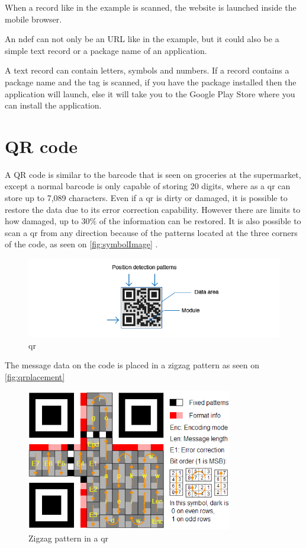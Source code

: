 When a record like in the example is scanned, the website is launched inside the mobile browser. 

An \ac{ndef} can not only be an URL like in the example, but it could also be a simple text record or a package name of an application. 

A text record can contain letters, symbols and numbers. If a record contains a package name and the tag is scanned, if you have the package installed then the application will launch, else it will take you to the Google Play Store where you can install the application. 

\section{QR code}

A QR code is similar to the barcode that is seen on groceries at the supermarket, except a normal barcode is only capable of storing 20 digits, where as a \ac{qr} can store up to 7,089 characters. Even if a \ac{qr} is dirty or damaged, it is possible to restore the data due to its error correction capability. However there are limits to how damaged, up to 30\% of the information can be restored. It is also possible to scan a \ac{qr} from any direction  because of the patterns located at the three corners of the code, as seen on \autoref{fig:symbolImage} \citep{qrcode}.

\begin{figure}[H]
\centering
\includegraphics[width=1.5\textwidth]{img/symbolImage.png}
\caption{\ac{qr}\citep{qrcode}}
\label{fig:symbolImage}
\end{figure}

The message data on the code is placed in a zigzag pattern as seen on \autoref{fig:qrplacement} 

\begin{figure}[H]
\centering
\includegraphics[width=0.8\textwidth]{img/qrplacement.png}
\caption{Zigzag pattern in a \ac{qr}\citep{qrcode1}}
\label{fig:qrplacement}
\end{figure}

